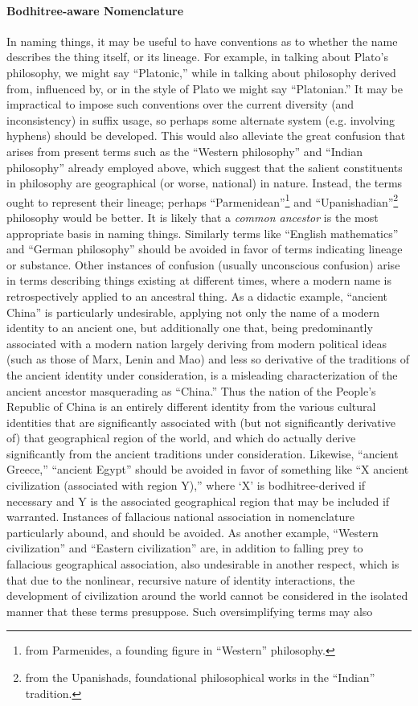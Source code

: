 \documentclass[pra,twocolumn,groupedaddress,10pt]{revtex4}
\theoremstyle{definition}
\begin{document}
\paragraph{Bodhitree-aware Nomenclature} In naming things, it may be useful to have conventions as to whether the name describes the thing itself, or its lineage. For example, in talking about Plato's philosophy, we might say ``Platonic,'' while in talking about philosophy derived from, influenced by, or in the style of Plato we might say ``Platonian.'' It may be impractical to impose such conventions over the current diversity (and inconsistency) in suffix usage, so perhaps some alternate system (e.g. involving hyphens) should be developed. This would also alleviate the great confusion that arises from present terms such as the ``Western philosophy'' and ``Indian philosophy'' already employed above, which suggest that the salient constituents in philosophy are geographical (or worse, national) in nature. Instead, the terms ought to represent their lineage; perhaps ``Parmenidean''\footnote{from Parmenides, a founding figure in ``Western'' philosophy.} and ``Upanishadian''\footnote{from the Upanishads, foundational philosophical works in the ``Indian'' tradition.} philosophy would be better. It is likely that a \emph{common ancestor} is the most appropriate basis in naming things. Similarly terms like ``English mathematics'' and ``German philosophy'' should be avoided in favor of terms indicating lineage or substance. Other instances of confusion (usually unconscious confusion) arise in terms describing things existing at different times, where a modern name is retrospectively applied to an ancestral thing. As a didactic example, ``ancient China'' is particularly undesirable, applying not only the name of a modern identity to an ancient one, but additionally one that, being predominantly associated with a modern nation largely deriving from modern political ideas (such as those of Marx, Lenin and Mao) and less so derivative of the traditions of the ancient identity under consideration, is a misleading characterization of the ancient ancestor masquerading as ``China.'' Thus the nation of the People's Republic of China is an entirely different identity from the various cultural identities that are significantly associated with (but not significantly derivative of) that geographical region of the world, and which do actually derive significantly from the ancient traditions under consideration. Likewise, ``ancient Greece,'' ``ancient Egypt'' should be avoided in favor of something like ``X ancient civilization (associated with region Y),'' where `X' is bodhitree-derived if necessary and Y is the associated geographical region that may be included if warranted. Instances of fallacious national association in nomenclature particularly abound, and should be avoided. As another example, ``Western civilization'' and ``Eastern civilization'' are, in addition to falling prey to fallacious geographical association, also undesirable in another respect, which is that due to the nonlinear, recursive nature of identity interactions, the development of civilization around the world cannot be considered in the isolated manner that these terms presuppose. Such oversimplifying terms may also 
\end{document}
